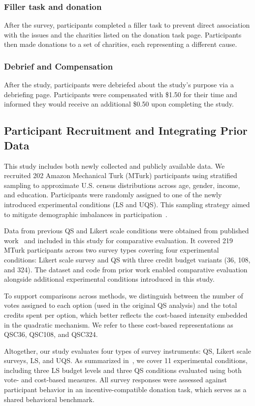 \subsubsection{Filler task and donation}
After the survey, participants completed a filler task to prevent direct association with the issues and the charities listed on the donation task page. Participants then made donations to a set of charities, each representing a different cause.

\subsubsection{Debrief and Compensation}
After the study, participants were debriefed about the study's purpose via a debriefing page. Participants were compensated with \$1.50 for their time and informed they would receive an additional \$0.50 upon completing the study.

\subsection{Participant Recruitment and Integrating Prior Data}
This study includes both newly collected and publicly available data. We recruited 202 Amazon Mechanical Turk (MTurk) participants using stratified sampling to approximate U.S. census distributions across age, gender, income, and education. Participants were randomly assigned to one of the newly introduced experimental conditions (LS and UQS). This sampling strategy aimed to mitigate demographic imbalances in participation~\cite{redmilesHowWellMy2019}.

Data from previous QS and Likert scale conditions were obtained from published work~\cite{chengCanShowWhat2021} and included in this study for comparative evaluation. It covered 219 MTurk participants across two survey types covering four experimental conditions: Likert scale survey and QS with three credit budget variants (36, 108, and 324). The dataset and code from prior work enabled comparative evaluation alongside additional experimental conditions introduced in this study.

To support comparisons across methods, we distinguish between the number of votes assigned to each option (used in the original QS analysis) and the total credits spent per option, which better reflects the cost-based intensity embedded in the quadratic mechanism. We refer to these cost-based representations as QSC36, QSC108, and QSC324.

Altogether, our study evaluates four types of survey instruments: QS, Likert scale surveys, LS, and UQS. As summarized in~, we cover 11 experimental conditions, including three LS budget levels and three QS conditions evaluated using both vote- and cost-based measures. All survey responses were assessed against participant behavior in an incentive-compatible donation task, which serves as a shared behavioral benchmark.

